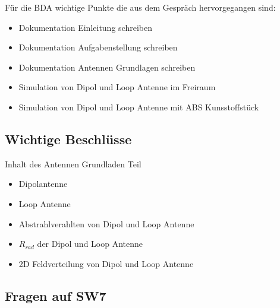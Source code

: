 \documentclass[10pt,a4paper]{article}
\begin{document}
\vspace{10 mm}
Für die BDA wichtige Punkte die aus dem Gespräch hervorgegangen sind:
\begin{itemize}
	\item Dokumentation Einleitung schreiben
	\item Dokumentation Aufgabenstellung schreiben
	\item Dokumentation Antennen Grundlagen schreiben
	\item Simulation von Dipol und Loop Antenne im Freiraum
	\item Simulation von Dipol und Loop Antenne  mit ABS Kunsstoffstück

\end{itemize}

\subsection*{Wichtige Beschlüsse}
Inhalt des Antennen Grundladen Teil
\begin{itemize}
	\item Dipolantenne
	\item Loop Antenne
	\item Abstrahlverahlten von Dipol und Loop Antenne
	\item $R_{rad}$ der Dipol und Loop Antenne
	\item 2D Feldverteilung von Dipol und Loop Antenne
\end{itemize}

\subsection*{Fragen auf SW7}
\end{document}
